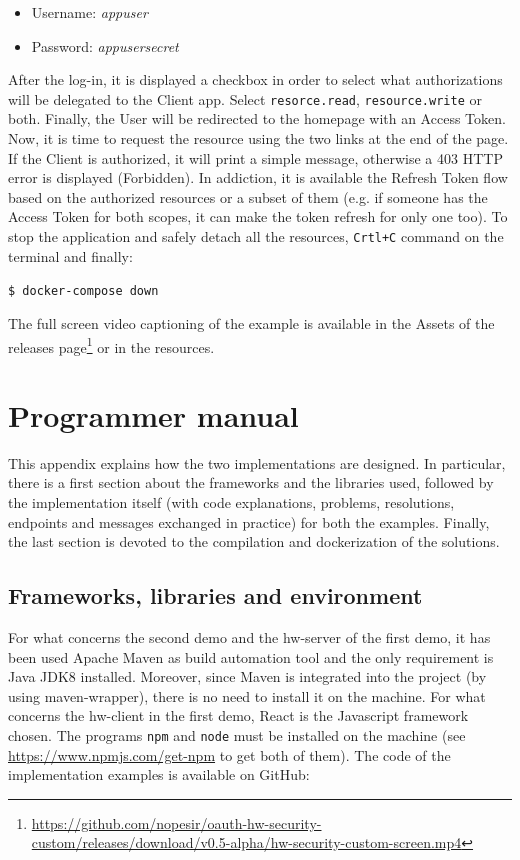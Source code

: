 \documentclass[a4paper,12pt]{article}
\begin{document}
\begin{itemize}
    \item Username: \textit{appuser}
    \item Password: \textit{appusersecret}
\end{itemize}

After the log-in, it is displayed a checkbox in order to select what authorizations will be delegated to the Client app. Select \texttt{resorce.read}, \texttt{resource.write} or both. 
Finally, the User will be redirected to the homepage with an Access Token. Now, it is time to request the resource using the two links at the end of the page. If the Client is authorized, it will print a simple message, otherwise a 403 HTTP error is displayed (Forbidden). In addiction, it is available the Refresh Token flow based on the authorized resources or a subset of them (e.g. if someone has the Access Token for both scopes, it can make the token refresh for only one too). To stop the application and safely detach all the resources, \texttt{Crtl+C} command on the terminal and finally:

\quad \texttt{\$ docker-compose down}

The full screen video captioning of the example is available in the Assets of the releases page\footnote{\scriptsize{\url{https://github.com/nopesir/oauth-hw-security-custom/releases/download/v0.5-alpha/hw-security-custom-screen.mp4}}} or in the resources.

\section{Programmer manual}
\label{progman}
This appendix explains how the two implementations are designed. In particular, there is a first section about the frameworks and the libraries used, followed by the implementation itself (with code explanations, problems, resolutions, endpoints and messages exchanged in practice) for both the examples. Finally, the last section is devoted to the compilation and dockerization of the solutions.

\subsection{Frameworks, libraries and environment}
For what concerns the second demo and the hw-server of the first demo, it has been used Apache Maven as build automation tool and the only requirement is Java JDK8 installed. Moreover, since Maven is integrated into the project (by using maven-wrapper), there is no need to install it on the machine.
For what concerns the hw-client in the first demo, React is the Javascript framework chosen. The programs \texttt{npm} and \texttt{node} must be installed on the machine (see \url{https://www.npmjs.com/get-npm} to get both of them). 
The code of the implementation examples is available on GitHub:
\end{document}
